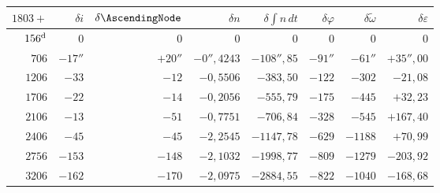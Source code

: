 \begin{landscape}
\begingroup
\fontsize{9}{11}\selectfont
\setlength{\tabcolsep}{3pt}
\begin{center}
\begin{tabular}{@{}r|r|r|r|r|r|r|r@{}}
\(1803+\) & \(\delta i\) & \(\delta\AscendingNode\) & \(\delta n\) & \(\delta\int n\,dt\) & \(\delta\varphi\) & \(\delta\widetilde\omega\) & \(\delta\varepsilon\)\\[3pt]
\hline
\(156^{\rm d}\) & \(0\) & \(0\) & \(0\) & \(0\) & \(0\) & \(0\) & \(0\)\\[3pt]
\(706\) & \(-17''\) & \(+20''\) & \(-0'',4243\) & \(-108'',85\) & \(-91''\) & \(-61''\) & \(+35'',00\)\\[3pt]
\(1206\) & \(-33\) & \(-12\) & \(-0{,}5506\) & \(-383{,}50\) & \(-122\) & \(-302\) & \(-21{,}08\)\\[3pt]
\(1706\) & \(-22\) & \(-14\) & \(-0{,}2056\) & \(-555{,}79\) & \(-175\) & \(-445\) & \(+32{,}23\)\\[3pt]
\(2106\) & \(-13\) & \(-51\) & \(-0{,}7751\) & \(-706{,}84\) & \(-328\) & \(-545\) & \(+167{,}40\)\\[3pt]
\(2406\) & \(-45\) & \(-45\) & \(-2{,}2545\) & \(-1147{,}78\) & \(-629\) & \(-1188\) & \(+70{,}99\)\\[3pt]
\(2756\) & \(-153\) & \(-148\) & \(-2{,}1032\) & \(-1998{,}77\) & \(-809\) & \(-1279\) & \(-203{,}92\)\\[3pt]
\(3206\) & \(-162\) & \(-170\) & \(-2{,}0975\) & \(-2884{,}55\) & \(-822\) & \(-1040\) & \(-168{,}68\)\\[3pt]
\end{tabular}
\end{center}
\endgroup
\end{landscape}
